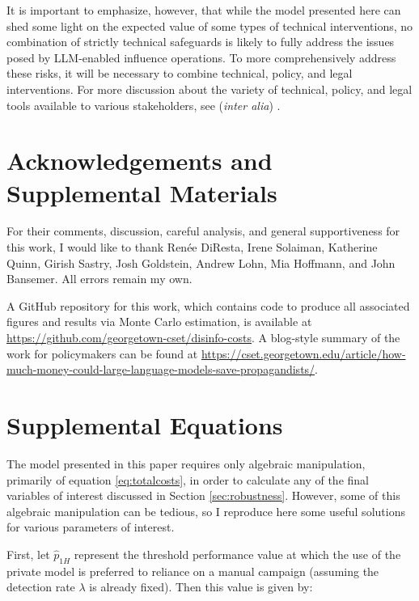 \documentclass{article}
\begin{document}
It is important to emphasize, however, that while the model presented here can shed some light on the expected value of some types of technical interventions, no combination of strictly technical safeguards is likely to fully address the issues posed by LLM-enabled influence operations. To more comprehensively address these risks, it will be necessary to combine technical, policy, and legal interventions. For more discussion about the variety of technical, policy, and legal tools available to various stakeholders, see (\textit{inter alia}) \cite{workshop, sedova1, sedova2, shelvane, solaiman, releasestrats, deepmind}. 

\section*{Acknowledgements and Supplemental Materials}

For their comments, discussion, careful analysis, and general supportiveness for this work, I would like to thank Renée DiResta, Irene Solaiman, Katherine Quinn, Girish Sastry, Josh Goldstein, Andrew Lohn, Mia Hoffmann, and John Bansemer. All errors remain my own. 

A GitHub repository for this work, which contains code to produce all associated figures and results via Monte Carlo estimation, is available at \href{https://github.com/georgetown-cset/disinfo-costs}{https://github.com/georgetown-cset/disinfo-costs}. A blog-style summary of the work for policymakers can be found at \href{https://cset.georgetown.edu/article/how-much-money-could-large-language-models-save-propagandists/}{https://cset.georgetown.edu/article/how-much-money-could-large-language-models-save-propagandists/}. 


\newpage 

\appendix
\section{Supplemental Equations}
\label{sec:supplemental}

The model presented in this paper requires only algebraic manipulation, primarily of equation \ref{eq:totalcosts}, in order to calculate any of the final variables of interest discussed in Section \ref{sec:robustness}. However, some of this algebraic manipulation can be tedious, so I reproduce here some useful solutions for various parameters of interest. 

First, let $\hat{p}_{1H}$ represent the threshold performance value at which the use of the private model is preferred to reliance on a manual campaign (assuming the detection rate $\lambda$ is already fixed). Then this value is given by:
\end{document}

